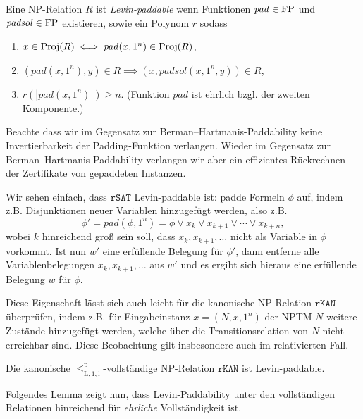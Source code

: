 \begin{definition}\label{def:levin-paddable}
    Eine NP-Relation $R$ ist \emph{Levin-paddable} wenn 
    Funktionen $\mathit{pad}\in\mathrm{FP}$ und $\mathit{padsol}\in\mathrm{FP}$ existieren, sowie ein Polynom $r$ sodass
    \begin{enumerate}
        \item $x\in \operatorname{Proj}(R) \iff \mathit{pad}(x, 1^n) \in \operatorname{Proj}(R)$,
        \item $(\mathit{pad}(x, 1^n), y)\in R \implies (x, \mathit{padsol}(x, 1^n, y)) \in R$,
        \item $r(|\mathit{pad}(x, 1^n)|)\geq n$. (Funktion $\mathit{pad}$ ist ehrlich bzgl. der zweiten Komponente.)\qedhere
    \end{enumerate}
\end{definition}
Beachte dass wir im Gegensatz zur Berman–Hartmanis-Paddability keine Invertierbarkeit der Padding-Funktion verlangen. Wieder im Gegensatz zur Berman–Hartmanis-Paddability verlangen wir aber ein effizientes Rückrechnen der Zertifikate von gepaddeten Instanzen.

Wir sehen einfach, dass $\mathtt{rSAT}$ Levin-paddable ist: padde Formeln $\phi$ auf, indem z.B. Disjunktionen neuer Variablen hinzugefügt werden, also z.B. 
\[ \phi' = \mathit{pad}(\phi, 1^n) = \phi \lor x_k \lor x_{k+1} \lor \cdots \lor x_{k+n}, \]
wobei $k$ hinreichend groß sein soll, dass $x_k, x_{k+1}, \dots$ nicht als Variable in $\phi$ vorkommt.
Ist nun $w'$ eine erfüllende Belegung für $\phi'$, dann entferne alle Variablenbelegungen $x_{k}, x_{k+1}, \dots$ aus $w'$ und es ergibt sich hieraus eine erfüllende Belegung $w$ für $\phi$.

Diese Eigenschaft lässt sich auch leicht für die kanonische NP-Relation $\mathtt{rKAN}$ überprüfen, 
indem z.B. für Eingabeinstanz $x=(N, x, 1^n)$ der NPTM $N$ weitere Zustände hinzugefügt werden, welche über die Transitionsrelation von $N$ nicht erreichbar sind.
Diese Beobachtung gilt insbesondere auch im relativierten Fall.
\begin{observation}\label{obs:rkan-paddable}
    Die kanonische $\leq_\mathrm{L,1,i}^\mathrm{p}$-vollständige NP-Relation $\mathtt{rKAN}$ ist Levin-paddable.
\end{observation}

Folgendes Lemma zeigt nun, dass Levin-Paddability unter den vollständigen Relationen hinreichend für \emph{ehrliche} Vollständigkeit ist.


